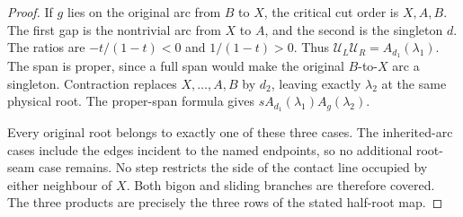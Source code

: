 \begin{proof}
If $g$ lies on the original arc from $B$ to $X$, the critical cut
order is $X,A,B$. The first gap is the nontrivial arc from $X$ to
$A$, and the second is the singleton $d$. The ratios are
$-t/(1-t)<0$ and $1/(1-t)>0$. Thus
$\mathcal U_L\mathcal U_R=A_{d_1}(\lambda_1)$.
The span is proper, since a full span would make the original
$B$-to-$X$ arc a singleton. Contraction replaces $X,\ldots,A,B$
by $d_2$, leaving exactly $\lambda_2$ at the same physical root.
The proper-span formula gives $sA_{d_1}(\lambda_1)A_g(\lambda_2)$.

Every original root belongs to exactly one of these three cases.
The inherited-arc cases include the edges incident to the named
endpoints, so no additional root-seam case remains. No step restricts
the side of the contact line occupied by either neighbour of $X$.
Both bigon and sliding branches are therefore covered. The three
products are precisely the three rows of the stated half-root map.
\end{proof}

